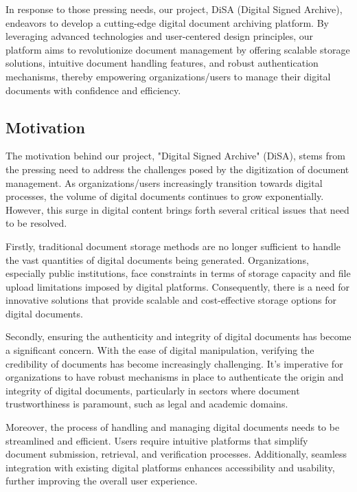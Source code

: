 \documentclass[a4paper,11pt]{article}
\begin{document}
        In response to those pressing needs, our project, DiSA (Digital Signed Archive), endeavors to develop a cutting-edge digital document archiving platform. By leveraging advanced technologies and user-centered design principles, our platform aims to revolutionize document management by offering scalable storage solutions, intuitive document handling features, and robust authentication mechanisms, thereby empowering organizations/users to manage their digital documents with confidence and efficiency.        
        
    \vspace{0.5cm}
    \subsection{Motivation}
        The motivation behind our project, "Digital Signed Archive" (DiSA), stems from the pressing need to address the challenges posed by the digitization of document management. As organizations/users increasingly transition towards digital processes, the volume of digital documents continues to grow exponentially. However, this surge in digital content brings forth several critical issues that need to be resolved.
        
        Firstly, traditional document storage methods are no longer sufficient to handle the vast quantities of digital documents being generated. Organizations, especially public institutions, face constraints in terms of storage capacity and file upload limitations imposed by digital platforms. Consequently, there is a need for innovative solutions that provide scalable and cost-effective storage options for digital documents.
        
        Secondly, ensuring the authenticity and integrity of digital documents has become a significant concern. With the ease of digital manipulation, verifying the credibility of documents has become increasingly challenging. It's imperative for organizations to have robust mechanisms in place to authenticate the origin and integrity of digital documents, particularly in sectors where document trustworthiness is paramount, such as legal and academic domains.
        
        Moreover, the process of handling and managing digital documents needs to be streamlined and efficient. Users require intuitive platforms that simplify document submission, retrieval, and verification processes. Additionally, seamless integration with existing digital platforms enhances accessibility and usability, further improving the overall user experience.
        
\end{document}

